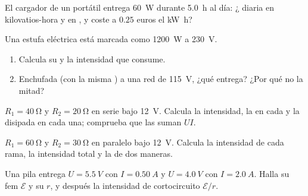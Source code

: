 \begin{exercise}[$\star$]\label{exo:g11:circuits-and-power:5}
El cargador de un portátil entrega \qty{60}{W} durante \qty{5.0}{h} al
día: ¿ diaria en kilovatios-hora y en , y coste a $0.25$
euros el \unit{kW.h}?
\end{exercise}

\begin{exercise}[$\star\star$]\label{exo:g11:circuits-and-power:6}
Una estufa eléctrica está marcada como \qty{1200}{W} a \qty{230}{V}.
\begin{enumerate}
  \item Calcula su  y la intensidad que consume.
  \item Enchufada (con la misma ) a una red de \qty{115}{V},
        ¿qué  entrega? ¿Por qué no la mitad?
\end{enumerate}
\end{exercise}

\begin{exercise}[$\star\star$]\label{exo:g11:circuits-and-power:7}
$R_1 = \qty{40}{\ohm}$ y $R_2 = \qty{20}{\ohm}$ en serie bajo
\qty{12}{V}. Calcula la intensidad, la  en cada  y la
 disipada en cada una; comprueba que las  suman $UI$.
\end{exercise}

\begin{exercise}[$\star\star$]\label{exo:g11:circuits-and-power:8}
$R_1 = \qty{60}{\ohm}$ y $R_2 = \qty{30}{\ohm}$ en paralelo bajo
\qty{12}{V}. Calcula la intensidad de cada rama, la intensidad total y
la  de dos maneras.
\end{exercise}

\begin{exercise}[$\star\star$]\label{exo:g11:circuits-and-power:9}
Una pila entrega $U = \qty{5.5}{V}$ con $I = \qty{0.50}{A}$ y
$U = \qty{4.0}{V}$ con $I = \qty{2.0}{A}$. Halla su fem $\mathcal{E}$ y
su  $r$, y después la intensidad de cortocircuito
$\mathcal{E}/r$.
\end{exercise}

